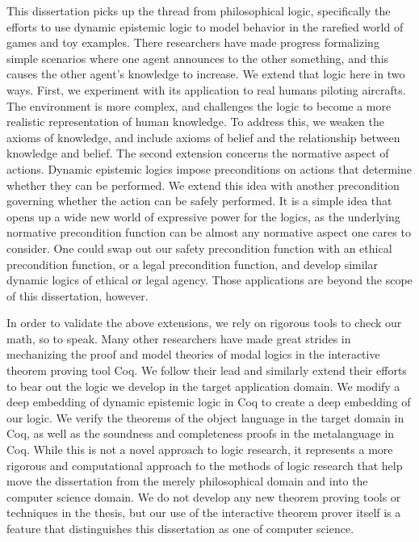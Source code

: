This dissertation picks up the thread from philosophical logic, specifically the efforts to use dynamic epistemic logic to model behavior in the rarefied world of games and toy examples. There researchers have made progress formalizing simple scenarios where one agent announces to the other something, and this causes the other agent's knowledge to increase. We extend that logic here in two ways. First, we experiment with its application to real humans piloting aircrafts. The environment is more complex, and challenges the logic to become a more realistic representation of human knowledge. To address this, we weaken the axioms of knowledge, and include axioms of belief and the relationship between knowledge and belief. The second extension concerns the normative aspect of actions. Dynamic epistemic logics impose preconditions on actions that determine whether they can be performed. We extend this idea with another precondition governing whether the action can be safely performed. It is a simple idea that opens up a wide new world of expressive power for the logics, as the underlying normative precondition function can be almost any normative aspect one cares to consider. One could swap out our safety precondition function with an ethical precondition function, or a legal precondition function, and develop similar dynamic logics of ethical or legal agency. Those applications are beyond the scope of this dissertation, however.

In order to validate the above extensions, we rely on rigorous tools to check our math, so to speak. Many other researchers have made great strides in mechanizing the proof and model theories of modal logics in the interactive theorem proving tool Coq. We follow their lead and similarly extend their efforts to bear out the logic we develop in the target application domain. We modify a deep embedding of dynamic epistemic logic in Coq to create a deep embedding of our logic. We verify the theorems of the object language in the target domain in Coq, as well as the soundness and completeness proofs in the metalanguage in Coq. While this is not a novel approach to logic research, it represents a more rigorous and computational approach to the methods of logic research that help move the dissertation from the merely philosophical domain and into the computer science domain. We do not develop any new theorem proving tools or techniques in the thesis, but our use of the interactive theorem prover itself is a feature that distinguishes this dissertation as one of computer science.

